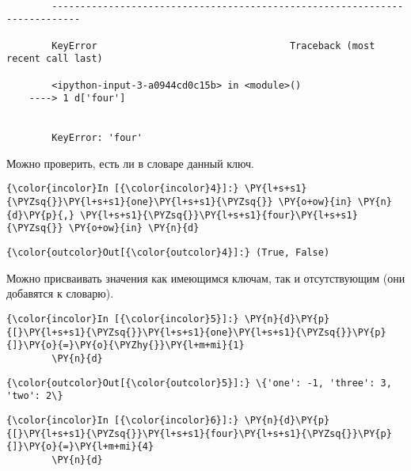     \begin{Verbatim}[commandchars=\\\{\}]

        ---------------------------------------------------------------------------

        KeyError                                  Traceback (most recent call last)

        <ipython-input-3-a0944cd0c15b> in <module>()
    ----> 1 d['four']
    

        KeyError: 'four'

    \end{Verbatim}

    Можно проверить, есть ли в словаре данный ключ.

    \begin{Verbatim}[commandchars=\\\{\}]
{\color{incolor}In [{\color{incolor}4}]:} \PY{l+s+s1}{\PYZsq{}}\PY{l+s+s1}{one}\PY{l+s+s1}{\PYZsq{}} \PY{o+ow}{in} \PY{n}{d}\PY{p}{,} \PY{l+s+s1}{\PYZsq{}}\PY{l+s+s1}{four}\PY{l+s+s1}{\PYZsq{}} \PY{o+ow}{in} \PY{n}{d}
\end{Verbatim}

            \begin{Verbatim}[commandchars=\\\{\}]
{\color{outcolor}Out[{\color{outcolor}4}]:} (True, False)
\end{Verbatim}
        
    Можно присваивать значения как имеющимся ключам, так и отсутствующим
(они добавятся к словарю).

    \begin{Verbatim}[commandchars=\\\{\}]
{\color{incolor}In [{\color{incolor}5}]:} \PY{n}{d}\PY{p}{[}\PY{l+s+s1}{\PYZsq{}}\PY{l+s+s1}{one}\PY{l+s+s1}{\PYZsq{}}\PY{p}{]}\PY{o}{=}\PY{o}{\PYZhy{}}\PY{l+m+mi}{1}
        \PY{n}{d}
\end{Verbatim}

            \begin{Verbatim}[commandchars=\\\{\}]
{\color{outcolor}Out[{\color{outcolor}5}]:} \{'one': -1, 'three': 3, 'two': 2\}
\end{Verbatim}
        
    \begin{Verbatim}[commandchars=\\\{\}]
{\color{incolor}In [{\color{incolor}6}]:} \PY{n}{d}\PY{p}{[}\PY{l+s+s1}{\PYZsq{}}\PY{l+s+s1}{four}\PY{l+s+s1}{\PYZsq{}}\PY{p}{]}\PY{o}{=}\PY{l+m+mi}{4}
        \PY{n}{d}
\end{Verbatim}

